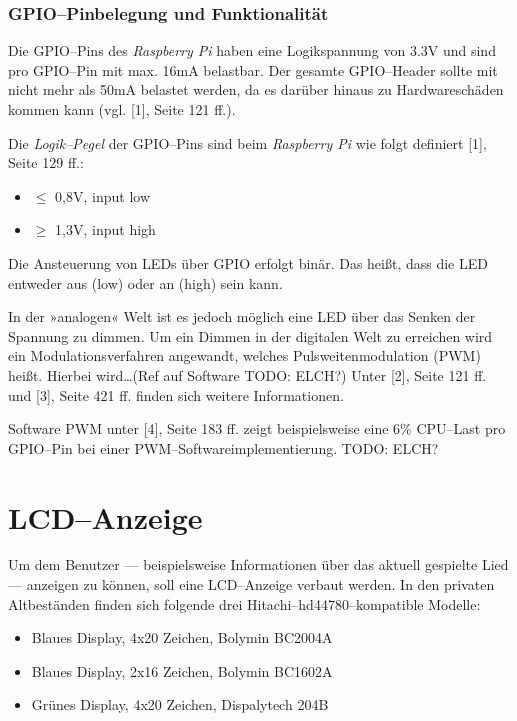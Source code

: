 \documentclass[11pt,ngerman,toc=listof,index=totoc]{scrreprt}
\providecommand{\tightlist}{%
  \setlength{\itemsep}{0pt}\setlength{\parskip}{0pt}}
\begin{document}
\subsubsection{GPIO--Pinbelegung und
Funktionalität}\label{gpiopinbelegung-und-funktionalituxe4t}

Die GPIO--Pins des \emph{Raspberry Pi} haben eine Logikspannung von 3.3V
und sind pro GPIO--Pin mit max. 16mA belastbar. Der gesamte GPIO--Header
sollte mit nicht mehr als 50mA belastet werden, da es darüber hinaus zu
Hardwareschäden kommen kann (vgl. {[}1{]}, Seite 121 ff.).

Die \emph{Logik--Pegel} der GPIO--Pins sind beim \emph{Raspberry Pi} wie
folgt definiert {[}1{]}, Seite 129 ff.:

\begin{itemize}
\tightlist
\item
  \(\le\) 0,8V, input low
\item
  \(\ge\) 1,3V, input high
\end{itemize}

Die Ansteuerung von LEDs über GPIO erfolgt binär. Das heißt, dass die
LED entweder aus (low) oder an (high) sein kann.

In der »analogen« Welt ist es jedoch möglich eine LED über das Senken
der Spannung zu dimmen. Um ein Dimmen in der digitalen Welt zu erreichen
wird ein Modulationsverfahren angewandt, welches Pulsweitenmodulation
(PWM) heißt. Hierbei wird\ldots{}(Ref auf Software TODO: ELCH?) Unter
{[}2{]}, Seite 121 ff. und {[}3{]}, Seite 421 ff. finden sich weitere
Informationen.

Software PWM unter {[}4{]}, Seite 183 ff. zeigt beispielsweise eine 6\%
CPU--Last pro GPIO--Pin bei einer PWM--Softwareimplementierung. TODO:
ELCH?

\section{LCD--Anzeige}\label{lcdanzeige}

Um dem Benutzer --- beispielsweise Informationen über das aktuell
gespielte Lied --- anzeigen zu können, soll eine LCD--Anzeige verbaut
werden. In den privaten Altbeständen finden sich folgende drei
Hitachi--hd44780--kompatible Modelle:

\begin{itemize}
\tightlist
\item
  Blaues Display, 4x20 Zeichen, Bolymin BC2004A
\item
  Blaues Display, 2x16 Zeichen, Bolymin BC1602A
\item
  Grünes Display, 4x20 Zeichen, Dispalytech 204B
\end{itemize}
\end{document}
